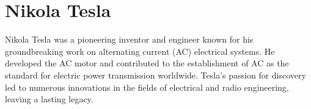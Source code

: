 \section{Nikola Tesla}
\label{app:Tesla}

Nikola Tesla was a pioneering inventor and engineer known for his groundbreaking work on alternating current (AC) electrical systems. He developed the AC motor and contributed to the establishment of AC as the standard for electric power transmission worldwide. Tesla's passion for discovery led to numerous innovations in the fields of electrical and radio engineering, leaving a lasting legacy.
